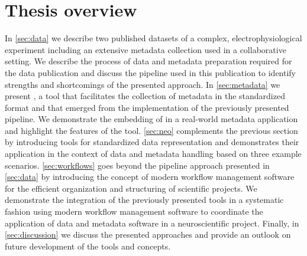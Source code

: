\section{Thesis overview}
In \cref{sec:data} we describe two published datasets of a complex, electrophysiological experiment including an extensive metadata collection used in a collaborative setting. We describe the process of data and metadata preparation required for the data publication and discuss the pipeline used in this publication to identify strengths and shortcomings of the presented approach. In \cref{sec:metadata} we present , a tool that facilitates the collection of metadata in the standardized  format and that emerged from the implementation of the previously presented pipeline. We demonstrate the embedding of  in a real-world metadata application and highlight the  features of the tool. \cref{sec:neo} complements the previous section by introducing tools for standardized data representation and demonstrates their application in the context of data and metadata handling based on three example scenarios. \cref{sec:workflows} goes beyond the pipeline approach presented in \cref{sec:data} by introducing the concept of modern workflow management software for the efficient organization and structuring of scientific projects. We demonstrate the integration of the previously presented tools in a systematic fashion using modern workflow management software to coordinate the application of data and metadata software in a neuroscientific project. Finally, in \cref{sec:discussion} we discuss the presented approaches and provide an outlook on future development of the tools and concepts.












































